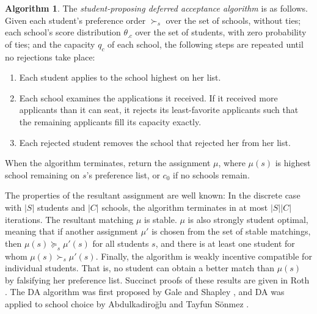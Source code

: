 \documentclass[12pt]{article}
\numberwithin{equation}{subsection}
\theoremstyle{definition}
\newtheorem{algorithm}{Algorithm}
\begin{document}
\begin{algorithm} \label{studentproposingDA}
The \emph{student-proposing deferred acceptance algorithm} is as follows. Given each student's preference order $\succ_s$ over the set of schools, without ties;  each school's score distribution $\theta_{.c}$ over the set of students, with zero probability of ties; and the capacity $q_c$ of each school, the following steps are repeated until no rejections take place:
\begin{enumerate}
\item Each student applies to the school highest on her list.
\item Each school examines the applications it received. If it received more applicants than it can seat, it rejects its least-favorite applicants such that the remaining applicants fill its capacity exactly.
\item Each rejected student removes the school that rejected her from her list.
\end{enumerate}
When the algorithm terminates, return the assignment $\mu$, where $\mu(s)$ is highest school remaining on $s$'s preference list, or $c_0$ if no schools remain. 
\end{algorithm}
The properties of the resultant assignment are well known: In the discrete case with $|S|$ students and $|C|$ schools, the algorithm terminates in at most $|S||C|$ iterations. The resultant matching $\mu$ is stable. $\mu$ is also strongly student optimal, meaning that if another assignment $\mu'$ is chosen from the set of stable matchings, then $\mu(s) \succeq_s \mu'(s)$ for all students $s$, and there is at least one student for whom $\mu(s) \succ_s \mu'(s)$. Finally, the algorithm is weakly incentive compatible for individual students. That is, no student can obtain a better match than $\mu(s)$ by falsifying her preference list. Succinct proofs of these results are given in Roth \parencite*{economicsofmatching}. The DA algorithm was first proposed by Gale and Shapley \parencite*{galeshapley1962}, and DA was applied to school choice by Abdulkadiro\u{g}lu and Tayfun S\"{o}nmez  \parencite*{schoolchoiceamechanismdesignapproach}. 
\end{document}
